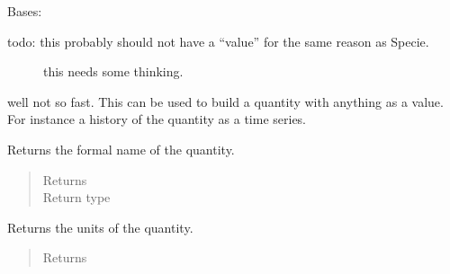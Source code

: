 \documentclass[letterpaper,10pt,openany,oneside,english]{sphinxmanual}
\begin{document}
\begin{fulllineitems}
\label{\detokenize{support_rst/quantity:quantity.Quantity}}
Bases: 
\begin{description}
\item[{todo: this probably should not have a “value” for the same reason as Specie.}] \leavevmode
this needs some thinking.

\end{description}

well not so fast. This can be used to build a quantity with anything as a
value. For instance a history of the quantity as a time series.

\begin{fulllineitems}
\label{\detokenize{support_rst/quantity:quantity.Quantity.GetFormalName}}
Returns the formal name of the quantity.
\begin{quote}\begin{description}
\item[{Returns}] \leavevmode
{}

\item[{Return type}] \leavevmode
{}

\end{description}\end{quote}

\end{fulllineitems}


\begin{fulllineitems}
\label{\detokenize{support_rst/quantity:quantity.Quantity.GetUnit}}
Returns the units of the quantity.
\begin{quote}\begin{description}
\item[{Returns}] \leavevmode
{}


\end{description}
\end{quote}
\end{fulllineitems}
\end{fulllineitems}
\end{document}
